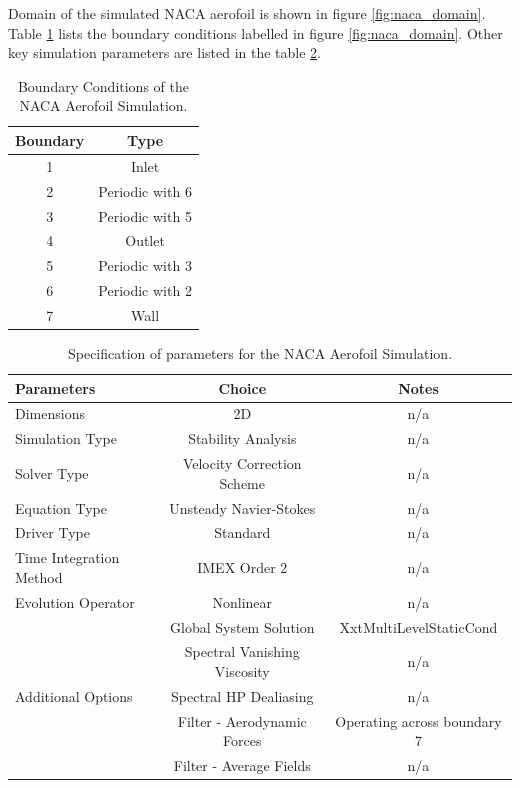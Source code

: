 \documentclass[11pt, a4paper]{report}
\begin{document}
Domain of the simulated NACA aerofoil is shown in figure \ref{fig:naca_domain}. Table \ref{tab:naca_boundaries} lists the boundary conditions labelled in figure \ref{fig:naca_domain}. Other key simulation parameters are listed in the table \ref{tab:naca_parameters}.

\begin{table}[htb!]
	\centering
    \begin{tabular}{ c || c }
    \hline
    Boundary & Type \\
    \hline
    1 & Inlet \\
    2 & Periodic with 6\\
    3 & Periodic with 5\\
    4 & Outlet\\
    5 & Periodic with 3\\
    6 & Periodic with 2\\
    7 & Wall\\
    \hline
    \end{tabular}
    \caption{Boundary Conditions of the NACA Aerofoil Simulation.}
    \label{tab:naca_boundaries}
\end{table}

\begin{table}[htb!]
	\centering
    \begin{tabular}{ l || c c}
    \hline
    Parameters & Choice & Notes \\
    \hline
    Dimensions & 2D & n/a\\
    Simulation Type & Stability Analysis & n/a\\
    Solver Type & Velocity Correction Scheme & n/a\\
    Equation Type & Unsteady Navier-Stokes & n/a\\
    Driver Type & Standard & n/a\\
    Time Integration Method & IMEX Order 2 & n/a\\
    Evolution Operator & Nonlinear & n/a\\   \hline
	 & Global System Solution & XxtMultiLevelStaticCond\\
	& Spectral Vanishing Viscosity & n/a\\
	Additional Options & Spectral HP Dealiasing & n/a\\
	& Filter - Aerodynamic Forces & Operating across boundary 7\\
	& Filter - Average Fields
	 & n/a\\
    \hline
    \end{tabular}
    \caption{Specification of parameters for the NACA Aerofoil Simulation.}
    \label{tab:naca_parameters}
\end{table}
\end{document}

